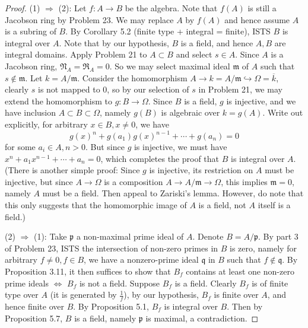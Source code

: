 \documentclass{solution}
\begin{document}
\begin{proof}
    (1) $\Rightarrow$ (2): Let $f: A \rightarrow B$ be the algebra. Note that $f(A)$ is still a Jacobson ring by Problem 23. We may replace $A$ by $f(A)$ and hence assume $A$ is a subring of $B$. By Corollary 5.2 (finite type + integral = finite), ISTS $B$ is integral over $A$. Note that by our hypothesis, $B$ is a field, and hence $A, B$ are integral domains. Apply Problem 21 to $A \subset B$ and select $s \in A$. Since $A$ is a Jacobson ring, $\mathfrak{N}_A = \mathfrak{R}_A = 0$. So we may select maximal ideal $\mathfrak{m}$ of $A$ such that $s \notin \mathfrak{m}$. Let $k = A / \mathfrak{m}$.  Consider the homomorphism $A \rightarrow k = A / \mathfrak{m} \hookrightarrow \Omega = \overline{k}$, clearly $s$ is not mapped to $0$, so by our selection of $s$ in Problem 21, we may extend the homomorphism to $g: B \rightarrow \Omega$. Since $B$ is a field, $g$ is injective, and we have inclusion $A \subset B \subset \Omega$, namely $g(B)$ is algebraic over $k = g(A)$. Write out explicitly, for arbitrary $x \in B, x \ne 0$, we have
    $$g(x)^n + g(a_1)g(x)^{n - 1} + \cdots + g(a_n) = 0$$
    for some $a_i \in A, n \gt 0$. But since $g$ is injective, we must have $x^n + a_1 x^{n - 1} + \cdots + a_n = 0$, which completes the proof that $B$ is integral over $A$. ({\color{red}There is another simple proof: Since $g$ is injective, its restriction on $A$ must be injective, but since $A \rightarrow \Omega$ is a composition $A \rightarrow A / \mathfrak{m} \rightarrow \Omega$, this implies $\mathfrak{m} = 0$, namely $A$ must be a field. Then appeal to Zariski's lemma. However, do note that this only suggests that the homomorphic image of $A$ is a field, not $A$ itself is a field.})

    (2) $\Rightarrow$ (1): Take $\mathfrak{p}$ a non-maximal prime ideal of $A$. Denote $B = A / \mathfrak{p}$. By part 3 of Problem 23, ISTS the intersection of non-zero primes in $B$ is zero, namely for arbitrary $f \ne 0, f \in B$, we have a nonzero-prime ideal $\mathfrak{q}$ in $B$ such that $f \notin \mathfrak{q}$. By Proposition 3.11, it then suffices to show that $B_f$ contains at least one non-zero prime ideals $\Leftrightarrow$ $B_f$ is not a field. Suppose $B_f$ is a field. Clearly $B_f$ is of finite type over $A$ (it is generated by $\frac{1}{f}$), by our hypothesis, $B_f$ is finite over $A$, and hence finite over $B$. By Proposition 5.1, $B_f$ is integral over $B$. Then by Proposition 5.7, $B$ is a field, namely $\mathfrak{p}$ is maximal, a contradiction.
\end{proof}
\end{document}
